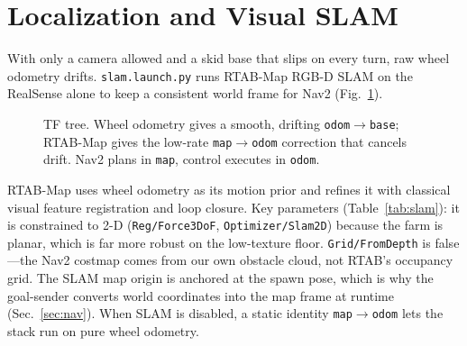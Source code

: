 \documentclass[10pt,journal,twoside]{IEEEtran}
\begin{document}
\section{Localization and Visual SLAM}
With only a camera allowed and a skid base that slips on every turn, raw wheel odometry drifts. \texttt{slam.launch.py} runs RTAB-Map RGB-D SLAM on the RealSense alone to keep a consistent world frame for Nav2 (Fig.~\ref{fig:tf}).

\begin{figure}[!t]
\centering
{}
\caption{TF tree. Wheel odometry gives a smooth, drifting \texttt{odom$\rightarrow$base}; RTAB-Map gives the low-rate \texttt{map$\rightarrow$odom} correction that cancels drift. Nav2 plans in \texttt{map}, control executes in \texttt{odom}.}
\label{fig:tf}
\end{figure}

RTAB-Map uses wheel odometry as its motion prior and refines it with classical visual feature registration and loop closure. Key parameters (Table~\ref{tab:slam}): it is constrained to 2-D (\texttt{Reg/Force3DoF}, \texttt{Optimizer/Slam2D}) because the farm is planar, which is far more robust on the low-texture floor. \texttt{Grid/FromDepth} is false---the Nav2 costmap comes from our own obstacle cloud, not RTAB's occupancy grid. The SLAM map origin is anchored at the spawn pose, which is why the goal-sender converts world coordinates into the map frame at runtime (Sec.~\ref{sec:nav}). When SLAM is disabled, a static identity \texttt{map$\rightarrow$odom} lets the stack run on pure wheel odometry.
\end{document}
